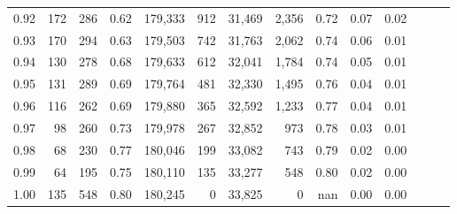 \begin{tabular}{rrrrrrrrrrrrrr}
0.92 &    172 &  286 &  0.62 &  179,333 &      912 &  31,469 &   2,356 &  0.72 &  0.07 &      0.02 \\
0.93 &    170 &  294 &  0.63 &  179,503 &      742 &  31,763 &   2,062 &  0.74 &  0.06 &      0.01 \\
0.94 &    130 &  278 &  0.68 &  179,633 &      612 &  32,041 &   1,784 &  0.74 &  0.05 &      0.01 \\
0.95 &    131 &  289 &  0.69 &  179,764 &      481 &  32,330 &   1,495 &  0.76 &  0.04 &      0.01 \\
0.96 &    116 &  262 &  0.69 &  179,880 &      365 &  32,592 &   1,233 &  0.77 &  0.04 &      0.01 \\
0.97 &     98 &  260 &  0.73 &  179,978 &      267 &  32,852 &     973 &  0.78 &  0.03 &      0.01 \\
0.98 &     68 &  230 &  0.77 &  180,046 &      199 &  33,082 &     743 &  0.79 &  0.02 &      0.00 \\
0.99 &     64 &  195 &  0.75 &  180,110 &      135 &  33,277 &     548 &  0.80 &  0.02 &      0.00 \\
1.00 &    135 &  548 &  0.80 &  180,245 &        0 &  33,825 &       0 &   nan &  0.00 &      0.00 \\
\bottomrule
\end{tabular}
